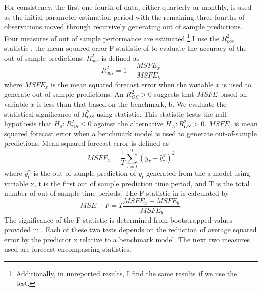 For consistency, the first one-fourth of data, either quarterly or monthly, is used as the initial parameter estimation period with the remaining three-fourths of observations moved through recursively  generating out of sample predictions. Four measures of out of sample performance are estimated.\footnote{Additionally, in unreported results, I find the same results if we use the \citet{Diebold1995} test.} I use the $R^{2}_{oos}$ statistic \citet{Campbell2008}, the mean squared error F-statistic of \cite{clark_tests_2001} to evaluate the accuracy of the out-of-sample predictions. $R^{2}_{oos}$ is defined as
\begin{equation} \label{eq:oos_r2}
R^{2}_{oos} = 1 - \frac{MSFE_{x}}{MSFE_{b}}
\end{equation}
where $MSFE_{x}$ is the mean squared forecast error when the variable $x$ is used to generate out-of-sample predictions. An $R^{2}_{OS} > 0$ suggests that $MSFE$ based on variable $x$ is less than that based on the benchmark, b. We evaluate the statistical significance of $R^{2}_{OS}$ using \cite{Clark2007} statistic. This statistic tests the null hypothesis that $H_{0}: R^{2}_{OS} \leq 0$ against the alternative $H_{A}: R^{2}_{OS} > 0$.
$MSFE_{b}$ is mean squared forecast error when a benchmark model is used to generate out-of-sample predictions. Mean squared forecast error is defined as
\begin{equation} \label{eq:msfe}
	MSFE_{x} = \frac{1}{T} \sum_{\tau=t}^{T} (y_{\tau} - \hat{y}^{x}_{\tau})^{2}
\end{equation}
where $\hat{y}^{x}_{t}$ is the out of sample prediction of $y_{t}$ generated from the a model using variable x, t is the first out of sample prediction time period, and T is the total number of out of sample time periods. The F-statistic in \citet{mccracken_asymptotics_2007} is calculated by
\begin{equation} \label{eq:mse-f}
MSE-F = T \frac{MSFE_{x}-MSFE_{b}}{MSFE_{b}}.
\end{equation}
The significance of the F-statistic is determined from bootstrapped values provided in \citet{mccracken_asymptotics_2007}.
Each of these two tests depends on the reduction of average squared error by the predictor x relative to a benchmark model. The next two measures used are forecast encompassing statistics. 

